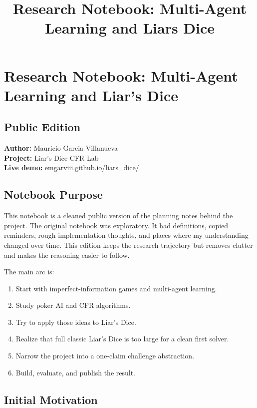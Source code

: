 \documentclass[
]{article}
\title{Research Notebook: Multi-Agent Learning and
Liar\textquotesingle s Dice}
\author{}
\date{}
\providecommand{\tightlist}{%
  \setlength{\itemsep}{0pt}\setlength{\parskip}{0pt}}
\begin{document}
\maketitle

\section{Research Notebook: Multi-Agent Learning and Liar's
Dice}\label{research-notebook-multi-agent-learning-and-liars-dice}

\subsection{Public Edition}\label{public-edition}

\textbf{Author:} Mauricio Garcia Villanueva\\
\textbf{Project:} Liar's Dice CFR Lab\\
\textbf{Live demo:} emgarviii.github.io/liars\_dice/

\subsection{Notebook Purpose}\label{notebook-purpose}

This notebook is a cleaned public version of the planning notes behind
the project. The original notebook was exploratory. It had definitions,
copied reminders, rough implementation thoughts, and places where my
understanding changed over time. This edition keeps the research
trajectory but removes clutter and makes the reasoning easier to follow.

The main arc is:

\begin{enumerate}
\def\labelenumi{\arabic{enumi}.}
\tightlist
\item
  Start with imperfect-information games and multi-agent learning.
\item
  Study poker AI and CFR algorithms.
\item
  Try to apply those ideas to Liar's Dice.
\item
  Realize that full classic Liar's Dice is too large for a clean first
  solver.
\item
  Narrow the project into a one-claim challenge abstraction.
\item
  Build, evaluate, and publish the result.
\end{enumerate}

\subsection{Initial Motivation}\label{initial-motivation}
\end{document}
